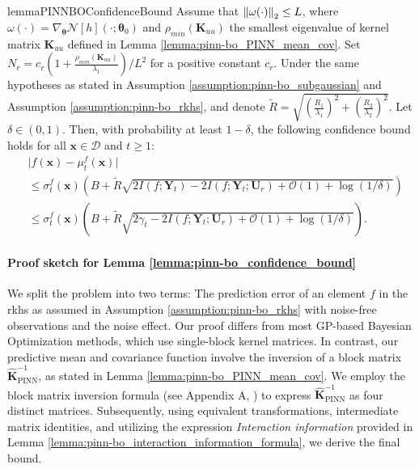 \begin{restatable}{lemma}{PINNBOConfidenceBound}
\label{lemma:pinn-bo_confidence_bound}
     Assume that $\norm{\omega(\cdot)}_2 \le L$, where $\omega(\cdot)  = \nabla_{\boldsymbol{\theta}} \mathcal{N}[h] (\cdot; \boldsymbol{\theta}_0)$ and $\rho_{min}(\mathbf{K}_{uu})$ the smallest eigenvalue of kernel matrix $\mathbf{K}_{uu}$ defined in Lemma \ref{lemma:pinn-bo_PINN_mean_cov}. Set $N_r = c_r\left(1+ \frac{\rho_{min}(\mathbf{K}_{uu})}{\lambda_1}\right)/L^2$ for a positive constant $c_r$. Under the same hypotheses as stated in Assumption \ref{assumption:pinn-bo_subgaussian} and Assumption \ref{assumption:pinn-bo_rkhs}, and denote $\widetilde{R} = \sqrt{\left(\frac{R_1}{\lambda_1}\right)^2 + \left(\frac{R_2}{\lambda_2}\right)^2}$. Let $\delta \in (0,1)$. Then,  with  probability at least $1 - \delta$, the following confidence bound holds for all $\mathbf{x} \in \mathcal{D}$ and $t \ge 1$:
    \begin{equation*}
    \begin{aligned}
            & \lvert f(\mathbf{x}) - \mu_t^f(\mathbf{x}) \rvert \\
            & \le \sigma_t^f(\mathbf{x}) \left(B +   \widetilde{R}\sqrt{2 I (f; \mathbf{Y}_t) - 2I (f; \mathbf{Y}_t; \mathbf{U}_r) + \mathcal{O}(1) + \log(1/\delta)}  \right) \\
            & \le \sigma_t^f(\mathbf{x}) \left(B +   \widetilde{R}\sqrt{2 \gamma_t - 2I (f; \mathbf{Y}_t; \mathbf{U}_r) + \mathcal{O}(1) + \log(1/\delta)}  \right).
        \end{aligned}
    \end{equation*}
\end{restatable}
\paragraph{Proof sketch for Lemma \ref{lemma:pinn-bo_confidence_bound}}
We split the problem into two terms: The prediction error of an element $f$ in the \ac{rkhs} as assumed in Assumption \ref{assumption:pinn-bo_rkhs} with noise-free observations and the noise effect. Our proof differs from most GP-based Bayesian Optimization methods, which use single-block kernel matrices. In contrast, our predictive mean and covariance function involve the inversion of a block matrix  $\mathbf{\widehat{K}}_\mathrm{PINN}^{-1}$, as stated in Lemma \ref{lemma:pinn-bo_PINN_mean_cov}. We employ the block matrix inversion formula (see Appendix A, \citep{rasmussen2006gaussian}) to express $\mathbf{\widehat{K}}_\mathrm{PINN}^{-1}$ as four distinct matrices. Subsequently, using equivalent transformations, intermediate matrix identities, and utilizing the expression \textit{Interaction information} provided in Lemma \ref{lemma:pinn-bo_interaction_information_formula}, we derive the final bound. 

